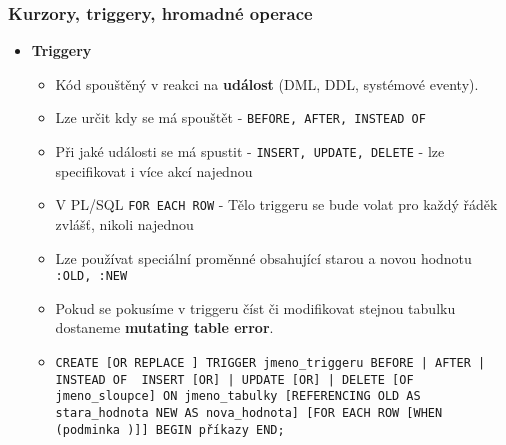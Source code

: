 \subsubsection{Kurzory, triggery, hromadné operace}
\begin{itemize}
\item\textbf{Triggery}
\begin{itemize}
\item Kód spouštěný v reakci na \textbf{událost} (DML, DDL, systémové eventy).
\item Lze určit kdy se má spouštět - \texttt{BEFORE, AFTER, INSTEAD OF}
\item Při jaké události se má spustit - \texttt{INSERT, UPDATE, DELETE} - lze specifikovat i více akcí najednou
\item V PL/SQL \texttt{FOR EACH ROW} - Tělo triggeru se bude volat pro každý řáděk zvlášť, nikoli najednou
\item Lze používat speciální proměnné obsahující starou a novou hodnotu \texttt{:OLD, :NEW}
\item Pokud se pokusíme v triggeru číst či modifikovat stejnou tabulku dostaneme \textbf{mutating table error}.
\item \texttt{CREATE [OR REPLACE ] TRIGGER jmeno\_triggeru {BEFORE | AFTER | INSTEAD OF } {INSERT [OR] | UPDATE [OR] | DELETE} [OF jmeno\_sloupce] ON jmeno\_tabulky [REFERENCING OLD AS stara\_hodnota NEW AS nova\_hodnota] [FOR EACH ROW [WHEN (podminka )]] BEGIN příkazy END;}
\end{itemize}
\end{itemize}



